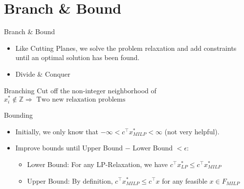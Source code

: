 \section{Branch \& Bound}

\begin{frame}{Branch \& Bound}
\begin{itemize}
\item Like Cutting Planes, we solve the problem relaxation and add constraints until an optimal solution has been found.
\item Divide \& Conquer
\end{itemize}
\end{frame}

\begin{frame}{Branching}
Cut off the non-integer neighborhood of $x_i^* \notin \mathbb{Z} \Rightarrow \text{ Two new relaxation problems}$
\end{frame}

\begin{frame}{Bounding}
\begin{itemize}
\item Initially, we only know that $-\infty < c^\top x_{MILP}^* < \infty$ (not very helpful).
\item Improve bounds until Upper Bound $-$ Lower Bound $< \epsilon$:
\begin{itemize}
\item Lower Bound: For any LP-Relaxation, we have $c^\top x_{LP}^* \leq c^\top x_{MILP}^*$
\item Upper Bound: By definition, $c^\top x_{MILP}^* \leq c^\top x$ for any feasible $x \in F_{MILP}$
\end{itemize}

\end{itemize}
\end{frame}